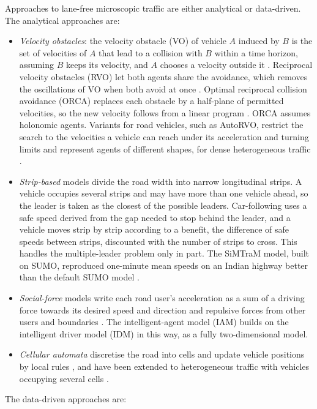 \documentclass[11pt]{article}
\begin{document}
Approaches to lane-free microscopic traffic are either analytical or data-driven.
The analytical approaches are:
\begin{itemize}\setlength{\itemsep}{1pt}
\item \emph{Velocity obstacles}: the velocity obstacle (VO) of vehicle $A$
induced by $B$ is the set of velocities of $A$ that lead to a collision with
$B$ within a time horizon, assuming $B$ keeps its velocity, and $A$ chooses a
velocity outside it \cite{vo98}. Reciprocal velocity obstacles (RVO) let both
agents share the avoidance, which removes the oscillations of VO when both
avoid at once \cite{rvo08}. Optimal reciprocal collision avoidance (ORCA)
replaces each obstacle by a half-plane of permitted velocities, so the new
velocity follows from a linear program \cite{orca11}. ORCA assumes holonomic
agents. Variants for road vehicles, such as AutoRVO, restrict the search to
the velocities a vehicle can reach under its acceleration and turning limits
and represent agents of different shapes, for dense heterogeneous traffic
\cite{autorvo18}.
\item \emph{Strip-based} models divide the road width into narrow longitudinal
strips. A vehicle occupies several strips and may have more than one vehicle
ahead, so the leader is taken as the closest of the possible leaders.
Car-following uses a safe speed derived from the gap needed to stop behind the
leader, and a vehicle moves strip by strip according to a benefit, the
difference of safe speeds between strips, discounted with the number of strips
to cross. This handles the multiple-leader problem only in part. The SiMTraM
model, built on SUMO, reproduced one-minute mean speeds on an Indian highway
better than the default SUMO model \cite{simtram15}.
\item \emph{Social-force} models write each road user's acceleration as a sum
of a driving force towards its desired speed and direction and repulsive forces
from other users and boundaries \cite{hm95}. The intelligent-agent model (IAM) \cite{iam} builds on the intelligent driver
model (IDM) \cite{idm} in this way, as a fully two-dimensional model.
\item \emph{Cellular automata} discretise the road into cells and update
vehicle positions by local rules \cite{ns92}, and have been extended to
heterogeneous traffic with vehicles occupying several cells \cite{mallikarjuna09}.
\end{itemize}
The data-driven approaches are:
\end{document}
